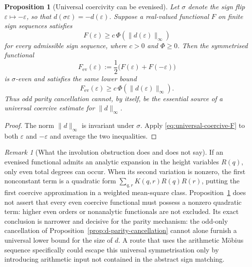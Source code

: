 \documentclass[11pt]{amsart}
\numberwithin{equation}{section}
\theoremstyle{plain}
\newtheorem{proposition}[theorem]{Proposition}
\theoremstyle{definition}
\theoremstyle{remark}
\newtheorem{remark}[theorem]{Remark}
\begin{document}
\begin{proposition}[Universal coercivity can be evenised]
\label{prop:coercivity-evenisation}
Let $\sigma$ denote the sign flip $\varepsilon\mapsto-\varepsilon$, so that
$d(\sigma\varepsilon)=-d(\varepsilon)$.  Suppose a real-valued functional
$F$ on finite sign sequences satisfies
\begin{equation}
\label{eq:universal-coercive-F}
F(\varepsilon)\ge c\,\Phi\!\left(\lVert d(\varepsilon)\rVert_\infty\right)
\end{equation}
for every admissible sign sequence, where $c>0$ and $\Phi\ge0$.  Then the
symmetrised functional
\begin{equation}
\label{eq:F-evenised}
F_{\mathrm{ev}}(\varepsilon):=\frac12\bigl(F(\varepsilon)+F(-\varepsilon)\bigr)
\end{equation}
is $\sigma$-even and satisfies the same lower bound
\begin{equation}
\label{eq:F-evenised-coercive}
F_{\mathrm{ev}}(\varepsilon)\ge c\,\Phi\!\left(\lVert d(\varepsilon)\rVert_\infty\right).
\end{equation}
Thus odd parity cancellation cannot, by itself, be the essential source of a
universal coercive estimate for $\lVert d\rVert_\infty$.
\end{proposition}

\begin{proof}
The norm $\lVert d\rVert_\infty$ is invariant under $\sigma$.  Apply
\eqref{eq:universal-coercive-F} to both $\varepsilon$ and $-\varepsilon$ and
average the two inequalities.
\end{proof}

\begin{remark}[What the involution obstruction does and does not say]
\label{rem:coercivity-evenisation-scope}
If an evenised functional admits an analytic expansion in the height variables
$R(q)$, only even total degrees can occur.  When its second variation is
nonzero, the first nonconstant term is a quadratic form
$\sum_{q,r}K(q,r)R(q)R(r)$, putting the first coercive approximation in a
weighted mean-square class.  Proposition~\ref{prop:coercivity-evenisation}
does not assert that every even coercive functional must possess a nonzero
quadratic term: higher even orders or nonanalytic functionals are not excluded.
Its exact conclusion is narrower and decisive for the parity mechanism: the
odd-only cancellation of Proposition~\ref{prop:d-parity-cancellation} cannot
alone furnish a universal lower bound for the size of $d$.  A route that uses
the arithmetic M\"obius sequence specifically could escape this universal
symmetrisation only by introducing arithmetic input not contained in the
abstract sign matching.
\end{remark}
\end{document}
